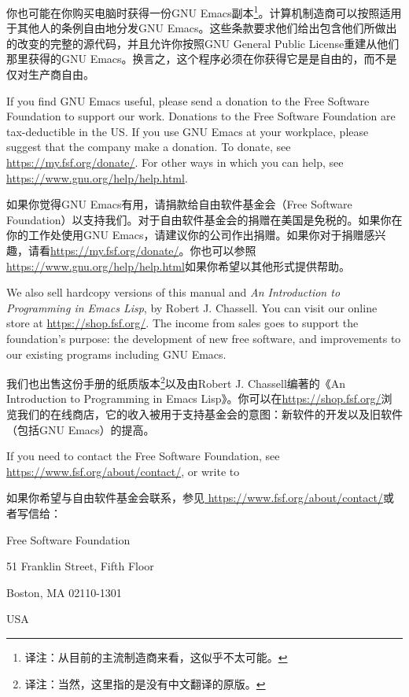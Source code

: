 你也可能在你购买电脑时获得一份GNU Emacs副本\footnote{译注：从目前的主流制造商来看，这似乎不太可能。}。计算机制造商可以按照适用于其他人的条例自由地分发GNU Emacs。这些条款要求他们给出包含他们所做出的改变的完整的源代码，并且允许你按照GNU General Public License重建从他们那里获得的GNU Emacs。换言之，这个程序必须在你获得它是是自由的，而不是仅对生产商自由。\par
If you find GNU Emacs useful, please send a donation to the Free Software Foundation to support our work. Donations to the Free Software Foundation are tax-deductible in the US. If you use GNU Emacs at your workplace, please suggest that the company make a donation. To donate, see \url{https://my.fsf.org/donate/}. For other ways in which you can help, see \url{https://www.gnu.org/help/help.html}.\par
如果你觉得GNU Emacs有用，请捐款给自由软件基金会（Free Software Foundation）以支持我们。对于自由软件基金会的捐赠在美国是免税的。如果你在你的工作处使用GNU Emacs，请建议你的公司作出捐赠。如果你对于捐赠感兴趣，请看\url{https://my.fsf.org/donate/}。你也可以参照\url{https://www.gnu.org/help/help.html}如果你希望以其他形式提供帮助。\par
We also sell hardcopy versions of this manual and \textit{An Introduction to Programming in Emacs Lisp}, by Robert J. Chassell. You can visit our online store at \url{https://shop.fsf.org/}. The income from sales goes to support the foundation’s purpose: the development of new free software, and improvements to our existing programs including GNU Emacs.\par
我们也出售这份手册的纸质版本\footnote{译注：当然，这里指的是没有中文翻译的原版。}以及由Robert J. Chassell编著的《An Introduction to Programming in Emacs Lisp》。你可以在\url{https://shop.fsf.org/}浏览我们的在线商店，它的收入被用于支持基金会的意图：新软件的开发以及旧软件（包括GNU Emacs）的提高。\par
If you need to contact the Free Software Foundation, see\url{ https://www.fsf.org/about/contact/}, or write to\par
如果你希望与自由软件基金会联系，参见\url{ https://www.fsf.org/about/contact/}或者写信给：\par
Free Software Foundation\par
51 Franklin Street, Fifth Floor\par
Boston, MA 02110-1301\par
USA

